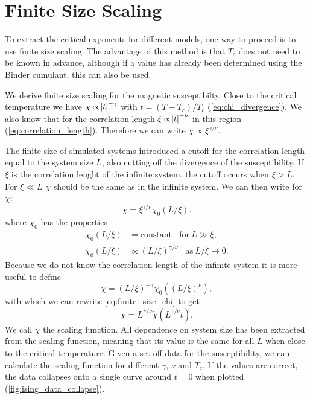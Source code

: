 \documentclass[11pt, a4paper]{report} %
\begin{document}
\section{Finite Size Scaling}
To extract the critical exponents for different models, one way to proceed is to use finite size scaling.
The advantage of this method is that \(T_c\) does not need to be known in advance, although if a value has already been determined using the Binder cumulant, this can also be used.

We derive finite size scaling for the magnetic susceptibilty.
Close to the critical temperature we have \(\chi \propto \abs{t} ^{-\gamma}\) with \(t = (T-T_c) / T_c\) (\cref{eq:chi_divergence}).
We also know that for the correlation length \(\xi \propto \abs{t}^{-\nu}\) in this region (\cref{eq:correlation_length}).
Therefore we can write \(\chi \propto \xi^{\gamma /\nu}\).

The finite size of simulated systems introduced a cutoff for the correlation length equal to the system size \(L\), also cutting off the divergence of the susceptibility.
If \(\xi\) is the correlation lenght of the infinite system, the cutoff occurs when \(\xi > L\).
For \(\xi \ll L\) \(\chi\) should be the same as in the infinite system.
We can then write for \(\chi\):
\begin{equation}\label{eq:finite_size_chi}
	\chi = \xi^{\gamma/\nu} \chi_0(L/\xi).
\end{equation}
where \(\chi_0\) has the properties
\begin{align}
	\chi_0(L/\xi) &= \mathrm{constant}\ \ \ \ \mathrm{for}\ L \gg \xi,\\
	\chi_0(L/\xi) &\propto (L/\xi)^{\gamma/\nu}\ \ \ \ \mathrm{as}\ L/\xi \to 0.
\end{align}
Because we do not know the correlation length of the infinite system it is more useful to define
\begin{equation}
	\tilde{\chi} = (L/\xi)^{-\gamma} \chi_0((L/\xi)^{\nu}),
\end{equation}
with which we can rewrite \cref{eq:finite_size_chi} to get
\begin{equation}
	\chi = L^{\gamma/\nu}\tilde{\chi}(L^{1/\nu}t).
\end{equation}
We call \(\tilde{\chi}\) the scaling function.
All dependence on system size has been extracted from the scaling function, meaning that its value is the same for all \(L\) when close to the critical temperature.
Given a set off data for the susceptibility, we can calculate the scaling function for different \(\gamma\), \(\nu\) and \(T_c\).
If the values are correct, the data collapses onto a single curve around \(t=0\) when plotted (\cref{fig:ising_data_collapse}).
\end{document}
